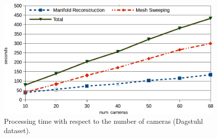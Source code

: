 \begin{figure}[t]
\centering
\includegraphics[width=0.99\columnwidth]{./img/ch-sweep/timing}
\caption{Processing time with respect to the number of cameras (Dagstuhl dataset).}
\label{fig:scalability}
\end{figure}

